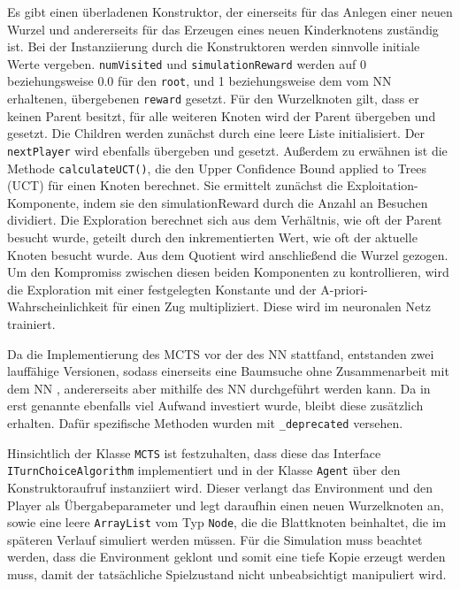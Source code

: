 \documentclass[12pt,a4paper]{article}
\begin{document}
Es gibt einen überladenen Konstruktor, der einerseits für das Anlegen einer neuen Wurzel und andererseits für das Erzeugen eines neuen Kinderknotens zuständig ist. Bei der Instanziierung durch die Konstruktoren werden sinnvolle initiale Werte vergeben. \texttt{numVisited} und \texttt{simulationReward} werden auf 0 beziehungsweise 0.0  für den \texttt{root}, und 1 beziehungsweise dem vom NN erhaltenen, übergebenen \texttt{reward} gesetzt. Für den Wurzelknoten gilt, dass er keinen Parent besitzt, für alle weiteren Knoten wird der Parent übergeben und gesetzt. Die Children werden zunächst durch eine leere Liste initialisiert. Der \texttt{nextPlayer} wird ebenfalls übergeben und gesetzt. Außerdem zu erwähnen ist die Methode \texttt{calculateUCT()}, die den Upper Confidence Bound applied to Trees (UCT) für einen Knoten berechnet. Sie ermittelt zunächst die Exploitation-Komponente, indem sie den simulationReward durch die Anzahl an Besuchen dividiert. Die Exploration berechnet sich aus dem Verhältnis, wie oft der Parent besucht wurde, geteilt durch den inkrementierten Wert, wie oft der aktuelle Knoten besucht wurde. Aus dem Quotient wird anschließend die Wurzel gezogen. Um den Kompromiss zwischen diesen beiden Komponenten zu kontrollieren, wird die Exploration mit einer festgelegten Konstante und der A-priori-Wahrscheinlichkeit für einen Zug multipliziert. Diese wird im neuronalen Netz trainiert.

Da die Implementierung des MCTS vor der des NN stattfand, entstanden zwei lauffähige Versionen, sodass einerseits eine Baumsuche ohne Zusammenarbeit mit dem NN , andererseits aber mithilfe des NN durchgeführt werden kann. Da in erst genannte ebenfalls viel Aufwand investiert wurde, bleibt diese zusätzlich erhalten. Dafür spezifische Methoden wurden mit \glqq{}\texttt{\_deprecated}\grqq{} versehen.

Hinsichtlich der Klasse \texttt{MCTS} ist festzuhalten, dass diese das Interface \texttt{ITurnChoiceAlgorithm} implementiert und in der Klasse \texttt{Agent} über den Konstruktoraufruf instanziiert wird. Dieser verlangt das Environment und den Player als Übergabeparameter und legt daraufhin einen neuen Wurzelknoten an, sowie eine leere \texttt{ArrayList} vom Typ \texttt{Node}, die die Blattknoten beinhaltet, die im späteren Verlauf simuliert werden müssen. Für die Simulation muss beachtet werden, dass die Environment geklont und somit eine tiefe Kopie erzeugt werden muss, damit der tatsächliche Spielzustand nicht unbeabsichtigt manipuliert wird. 
\end{document}
